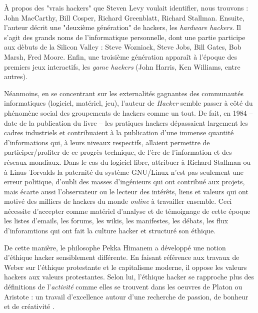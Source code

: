 \`A propos des "vrais hackers" que Steven Levy voulait identifier, nous trouvons : John MacCarthy, Bill Cosper, Richard Greenblatt, Richard Stallman. Ensuite, l'auteur décrit une "deuxième génération" de hackers, les \emph{hardware hackers}. Il s'agit des grands noms de l'informatique personnelle, dont une partie participe aux dèbuts de la Silicon Valley : Steve Wozniack, Steve Jobs, Bill Gates, Bob Marsh, Fred Moore. Enfin, une troisième génération apparaît à l'époque des premiers jeux interactifs, les \emph{game hackers} (John Harris, Ken Williams, entre autres).

Néanmoins, en se concentrant sur les externalités gagnantes des communautés informatiques (logiciel, matériel, jeu), l'auteur de \emph{Hacker} semble passer à côté du phénomène social des groupements de hackers comme un tout. De fait, en 1984 -- date de la publication du livre -- les pratiques hackers dépassaient largement les cadres industriels et contribuaient à la publication d'une immense quantité d'informations qui, à leurs niveaux respectifs, allaient permettre de participer/profiter de ce progrès technique, de l'ère de l'information et des réseaux mondiaux. Dans le cas du logiciel libre, attribuer à Richard Stallman ou à Linus Torvalds la paternité du système GNU/Linux n'est pas seulement une erreur politique, d'oubli des masses d'ingénieurs qui ont contribué aux projets, mais écarte aussi l'observateur ou le lecteur des intérêts, liens et valeurs qui ont motivé des milliers de hackers du monde \emph{online} à travailler ensemble. Ceci nécessite d'accepter comme matériel d'analyse et de témoignage de cette époque les listes d'emails, les forums, les wikis, les manifestes, les débats, les flux d'inforamtions qui ont fait la culture hacker et structuré son éthique.

De cette manière, le philosophe Pekka Himanem a développé une notion d'éthique hacker sensiblement différente. En faisant référence aux travaux de Weber sur l'éthique protestante et le capitalisme moderne, il oppose les valeurs hackers aux valeurs protestantes.
Selon lui, l'éthique hacker se rapproche plus des définitions de l'\emph{activité} comme elles se trouvent dans les oeuvres de Platon ou Aristote : un travail d'excellence autour d'une recherche de passion, de bonheur et de créativité \citep{Himanem2001}.

